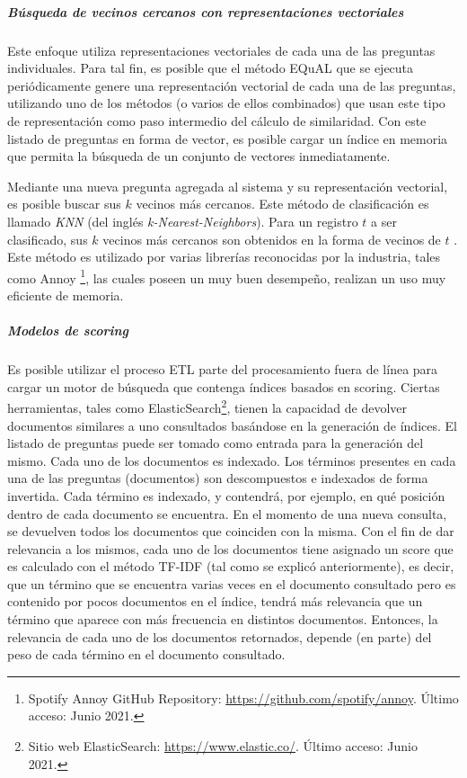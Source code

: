 \subparagraph{Búsqueda de vecinos cercanos con representaciones vectoriales}
Este enfoque utiliza representaciones vectoriales de cada una de las preguntas individuales. Para tal fin, es posible que el método EQuAL que se ejecuta periódicamente genere una representación vectorial de cada una de las preguntas, utilizando uno de los métodos (o varios de ellos combinados) que usan este tipo de representación como paso intermedio del cálculo de similaridad. Con este listado de preguntas en forma de vector, es posible cargar un índice en memoria que permita la búsqueda de un conjunto de vectores inmediatamente.

\bigskip Mediante una nueva pregunta agregada al sistema y su representación vectorial, es posible buscar sus \(k\) vecinos más cercanos. Este método de clasificación es llamado \textit{KNN} (del inglés \textit{k-Nearest-Neighbors}). Para un registro \(t\) a ser clasificado, sus \(k\) vecinos más cercanos son obtenidos en la forma de vecinos de \(t\) \citep{guo2003knn}. Este método es utilizado por varias librerías reconocidas por la industria, tales como Annoy \footnote{Spotify Annoy GitHub Repository: \url{https://github.com/spotify/annoy}. Último acceso: Junio 2021.}, las cuales poseen un muy buen desempeño, realizan un uso muy eficiente de memoria.

\subparagraph{Modelos de scoring}
Es posible utilizar el proceso ETL parte del procesamiento fuera de línea para cargar un motor de búsqueda que contenga índices basados en scoring. Ciertas herramientas, tales como ElasticSearch\footnote{Sitio web ElasticSearch: \url{https://www.elastic.co/}. Último acceso: Junio 2021.}, tienen la capacidad de devolver documentos similares a uno consultados basándose en la generación de índices. El listado de preguntas puede ser tomado como entrada para la generación del mismo. Cada uno de los documentos es indexado. Los términos presentes en cada una de las preguntas (documentos) son descompuestos e indexados de forma invertida. Cada término es indexado, y contendrá, por ejemplo, en qué posición dentro de cada documento se encuentra. En el momento de una nueva consulta, se devuelven todos los documentos que coinciden con la misma. Con el fin de dar relevancia a los mismos, cada uno de los documentos tiene asignado un score que es calculado con el método TF-IDF (tal como se explicó anteriormente), es decir, que un término que se encuentra varias veces en el documento consultado pero es contenido por pocos documentos en el índice, tendrá más relevancia que un término que aparece con más frecuencia en distintos documentos. Entonces, la relevancia de cada uno de los documentos retornados, depende (en parte) del peso de cada término en el documento consultado.

